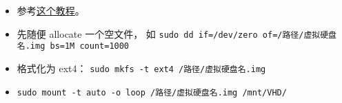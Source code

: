 
\begin{issues}
\issueDraft
\end{issues}

\begin{itemize}
\item 参考\href{https://www.tecmint.com/create-virtual-harddisk-volume-in-linux/}{这个教程}。
\item 先随便 allocate 一个空文件， 如 \verb|sudo dd if=/dev/zero of=/路径/虚拟硬盘名.img bs=1M count=1000|
\item 格式化为 ext4： \verb|sudo mkfs -t ext4 /路径/虚拟硬盘名.img|
\item \verb|sudo mount -t auto -o loop /路径/虚拟硬盘名.img /mnt/VHD/|
\end{itemize}
